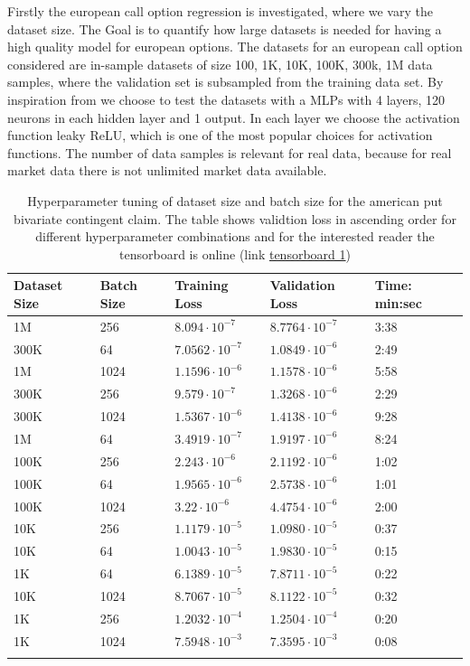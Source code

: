 Firstly the european call option regression is investigated, where we vary the dataset size. The Goal is to quantify how large datasets is needed for having a high quality model for european options. The datasets for an european call option considered are in-sample datasets of size 100, 1K, 10K, 100K, 300k, 1M data samples, where the validation set is subsampled from the training data set. By inspiration from \parencite{HirsaAli2019} we choose to test the datasets with a MLPs with 4 layers, 120 neurons in each hidden layer and 1 output. In each layer we choose the activation function leaky ReLU, which is one of the most popular choices for activation functions. The number of data samples is relevant for real data, because for real market data there is not unlimited market data available.
\begin{table}[th]
\caption{Hyperparameter tuning of dataset size and batch size for the american put bivariate contingent claim. The table shows validtion loss in ascending order for different hyperparameter combinations and for the interested reader the tensorboard is online (link \href{https://tensorboard.dev/experiment/8pxUoSDmTVGMOxpJWgiZsA/}{tensorboard 1})}
\label{tab:hyperEuroC1}
\centering
\begin{tabular}{lllll}
\toprule
\textbf{Dataset Size} & \textbf{Batch Size} & \textbf{Training Loss} & \textbf{Validation Loss} & \textbf{Time: min:sec}\\
\midrule
1M    & 256   & $8.094\cdot 10^{-7}$ & $8.7764\cdot 10^{-7}$ & 3:38 \\ 
300K  & 64    & $7.0562\cdot 10^{-7}$ & $1.0849\cdot 10^{-6}$ & 2:49 \\ 
1M    & 1024  & $1.1596\cdot 10^{-6}$ & $1.1578\cdot 10^{-6}$ & 5:58 \\ 
300K  & 256   & $9.579\cdot 10^{-7}$ & $1.3268\cdot 10^{-6}$ & 2:29 \\ 
300K  & 1024  & $1.5367\cdot 10^{-6}$ & $1.4138\cdot 10^{-6}$ & 9:28 \\ 
1M   & 64    & $3.4919\cdot 10^{-7}$ & $1.9197\cdot 10^{-6}$ & 8:24\\ 
100K  & 256   & $2.243\cdot 10^{-6}$ & $2.1192\cdot 10^{-6}$ & 1:02  \\ 
100K  & 64    & $1.9565\cdot 10^{-6}$ & $2.5738\cdot 10^{-6}$ & 1:01 \\ 
100K  & 1024  & $3.22\cdot 10^{-6}$ & $4.4754\cdot 10^{-6}$ & 2:00\\ 
10K  & 256   & $1.1179\cdot 10^{-5}$ & $1.0980\cdot 10^{-5}$ & 0:37 \\ 
10K   & 64    & $1.0043\cdot 10^{-5}$ & $1.9830\cdot 10^{-5}$ & 0:15 \\ 
1K   & 64    & $6.1389\cdot 10^{-5}$ & $7.8711\cdot 10^{-5}$ & 0:22\\ 
10K   & 1024 & $8.7067\cdot 10^{-5}$ & $8.1122\cdot 10^{-5}$ & 0:32  \\ 
1K   & 256   & $1.2032\cdot 10^{-4}$ & $1.2504\cdot 10^{-4}$ & 0:20    \\ 
1K    & 1024  & $7.5948\cdot 10^{-3}$ & $7.3595\cdot 10^{-3}$ & 0:08    \\ 
\bottomrule\\
\end{tabular}
\end{table}
